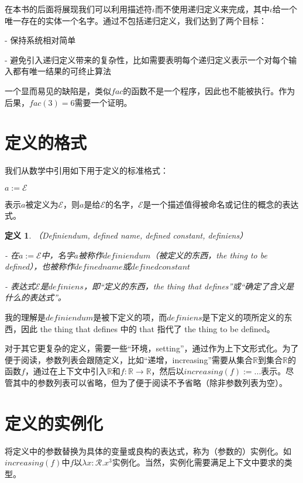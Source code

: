 \documentclass[UTF8]{article}
\newtheorem{thm}{定义}[section]
\begin{document}
		在本书的后面将展现我们可以利用描述符$\iota$而不使用递归定义来完成，其中$\iota$给一个唯一存在的实体一个名字。通过不包括递归定义，我们达到了两个目标：
		
		\noindent
		- 保持系统相对简单
		
		\noindent
		- 避免引入递归定义带来的复杂性，比如需要表明每个递归定义表示一个对每个输入都有唯一结果的可终止算法
		
		一个显而易见的缺陷是，类似$fac$的函数不是一个程序，因此也不能被执行。作为后果，$fac(3)=6$需要一个证明。
		
	\section{定义的格式}
	\noindent
	我们从数学中引用如下用于定义的标准格式：
		
		$a:=\mathcal{E}$
		
		表示$a$被定义为$\mathcal{E}$，则$a$是给$\mathcal{E}$的名字，$\mathcal{E}$是一个描述值得被命名或记住的概念的表达式。
		
		\begin{thm}（Definiendum, defined name, defined constant, definiens）
			
			- 在$a:=\mathcal{E}$中，名字$a$被称作$definiendum$（被定义的东西，the thing to be defined），也被称作$defined name$或$defined constant$
			
			- 表达式$\mathcal{E}$是$definiens$，即“定义的东西，the thing that defines”或“确定了含义是什么的表达式”。
		\end{thm}
	
		我的理解是$definiendum$是被下定义的项，而$definiens$是下定义的项所定义的东西，因此 the thing that defines 中的 that 指代了 the thing to be defined。
		
		对于其它更复杂的定义，需要一些“环境，setting”，通过作为上下文形式化。为了便于阅读，参数列表会跟随定义，比如“递增，increasing”需要从集合$\mathbb{R}$到集合$\mathbb{R}$的函数$f$，通过在上下文中引入$\mathbb{R}$和$f:\mathbb{R}\rightarrow\mathbb{R}$，然后以$increasing(f) := ...$表示。尽管其中的参数列表可以省略，但为了便于阅读不予省略（除非参数列表为空）。
		
	\section{定义的实例化}
	\noindent
	将定义中的参数替换为具体的变量或良构的表达式，称为（参数的）实例化。如$increasing(f)$中$f$以$\lambda x:\mathcal{R}.x^3$实例化。当然，实例化需要满足上下文中要求的类型。
	
\end{document}
